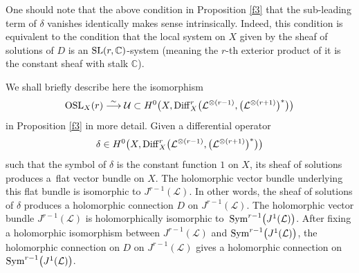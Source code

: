 \documentclass[pdftex]{sigma}
\numberwithin{equation}{section}
\begin{document}
\begin{Remark}One should note that the above condition in Proposition \ref{f3} that the sub-leading term of $\delta$ vanishes
identically makes sense intrinsically. Indeed, this condition is equivalent to the condition
that the local system on $X$ given by the sheaf of solutions of $D$ is an ${\rm SL}(r,
{\mathbb C})$-system (meaning the $r$-th exterior product of it is the constant sheaf with
stalk $\mathbb C$).\end{Remark}

We shall briefly describe here the isomorphism
\[{\rm OSL}_X(r) \stackrel{\sim}
{\longrightarrow} \mathcal U \subset H^0\bigl(X, {\rm Diff}^r_X
\bigl({\mathcal L}^{\otimes (r-1)}, \bigl({\mathcal L}^{\otimes (r+1)}\bigr)^*\bigr)\bigr)\]
in Proposition \ref{f3} in more detail. Given a differential operator
\[
\delta \in H^0\bigl(X, {\rm Diff}^r_X\bigl({\mathcal
L}^{\otimes (r-1)}, \bigl({\mathcal L}^{\otimes (r+1)}\bigr)^*\bigr)\bigr)\]
 such that the symbol of $\delta$ is the constant function
$1$ on $X$, its sheaf of solutions produces a~flat vector bundle on $X$. The holomorphic
vector bundle underlying this flat bundle is isomorphic to $J^{r-1}(\mathcal L)$. In other
words, the sheaf of solutions of $\delta$ produces a holomorphic connection $D$ on
$J^{r-1}(\mathcal L)$. The holomorphic vector bundle $J^{r-1}(\mathcal L)$ is
holomorphically isomorphic to~${\rm Sym}^{r-1}\bigl(J^1(\mathcal L)\bigr)$. After fixing a
holomorphic isomorphism between $J^{r-1}(\mathcal L)$ and ${\rm Sym}^{r-1}\bigl(J^1(\mathcal
L)\bigr)$, the holomorphic connection on $D$ on $J^{r-1}(\mathcal L)$ gives a holomorphic
connection on ${\rm Sym}^{r-1}\bigl(J^1(\mathcal L)\bigr)$.
\end{document}
